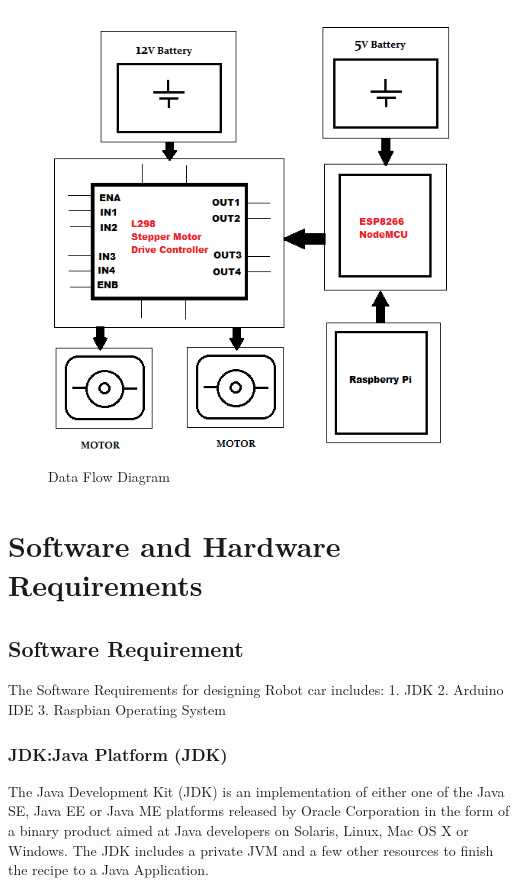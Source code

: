 \begin{figure}[htb]
      \centering\includegraphics[width=\columnwidth]{images/FlowDiagram.png}
      \caption{Data Flow Diagram}\label{F:flow}
\end{figure}

\section{Software and Hardware Requirements}

\subsection{Software Requirement}
The Software Requirements for designing Robot car includes:
1. JDK
2. Arduino IDE
3. Raspbian Operating System

\subsubsection{JDK:Java Platform (JDK)}
The Java Development Kit (JDK) is an implementation of either one of the 
Java SE, Java EE or Java ME platforms released by Oracle Corporation in the 
form of a binary product aimed at Java developers on Solaris, Linux, Mac OS 
X or Windows. The JDK includes a private JVM and a few other resources to 
finish the recipe to a Java Application.

